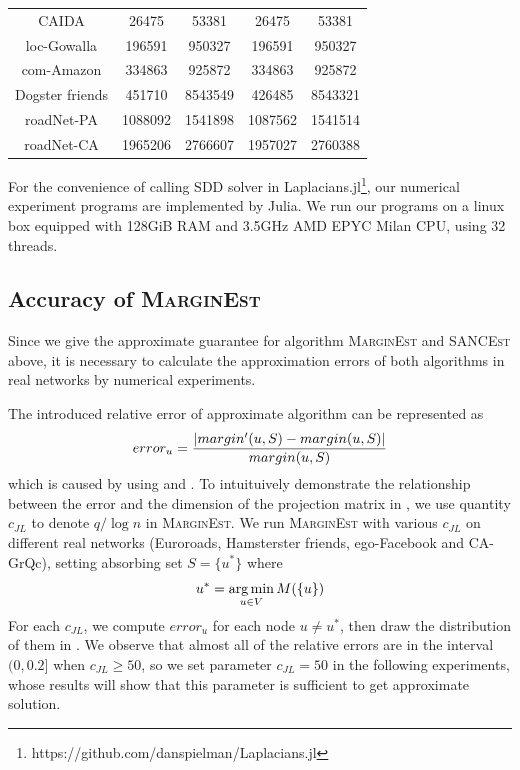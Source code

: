 \documentclass[sigconf]{acmart}
\begin{document}
\begin{table}
\begin{tabular}{ccccc}
        CAIDA               & 26475   & 53381   & 26475   & 53381   \\
        loc-Gowalla         & 196591  & 950327  & 196591  & 950327  \\
        com-Amazon          & 334863  & 925872  & 334863  & 925872  \\
        Dogster friends     & 451710  & 8543549 & 426485  & 8543321 \\
        roadNet-PA          & 1088092 & 1541898 & 1087562 & 1541514 \\
        roadNet-CA          & 1965206 & 2766607 & 1957027 & 2760388 \\
        \bottomrule
    \end{tabular}
\end{table}

For the convenience of calling SDD solver in Laplacians.jl\footnote{https://github.com/danspielman/Laplacians.jl}, our numerical experiment programs are implemented by Julia.
We run our programs on a linux box equipped with 128GiB RAM and 3.5GHz AMD EPYC Milan CPU, using 32 threads.

\subsection{Accuracy of \textsc{MarginEst}}

Since we give the approximate guarantee for algorithm \textsc{MarginEst} and \textsc{SANCEst} above, it is necessary to calculate the approximation errors of both algorithms in real networks by numerical experiments.

The introduced relative error of approximate algorithm can be represented as
\[error_u=\frac{\left|margin'(u,S)-margin(u,S) \right|}{margin(u,S)}\]
which is caused by using  and .
To intuituively demonstrate the relationship between the error and the dimension of the projection matrix in , we use quantity \(c_{JL}\) to denote \(q/\log n\) in \textsc{MarginEst}.
We run \textsc{MarginEst} with various \(c_{JL}\) on different real networks (Euroroads, Hamsterster friends, ego-Facebook and CA-GrQc), setting absorbing set \(S=\{u^*\}\) where
\[u^*=\operatorname*{arg\,min}_{u\in V}M(\{u\})\]
For each \(c_{JL}\), we compute \(error_u\) for each node \(u\neq u^*\), then draw the distribution of them in .
We observe that almost all of the relative errors are in the interval \((0,0.2]\) when \(c_{JL}\ge50\), so we set parameter \(c_{JL}=50\) in the following experiments, whose results will show that this parameter is sufficient to get approximate solution.
\end{document}
